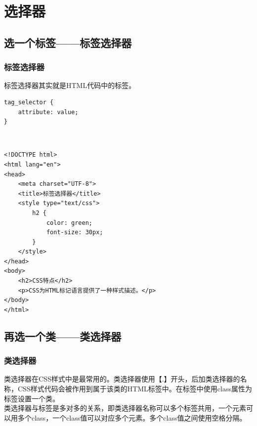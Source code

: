 \newpage

\chapter{选择器}

\section{选一个标签——标签选择器}

\subsection{标签选择器}

标签选择器其实就是HTML代码中的标签。 \\

\begin{lstlisting}[style=htmlcssjs]
tag_selector {
    attribute: value;
}
\end{lstlisting}

\vspace{0.5cm}
 \\
\begin{lstlisting}[style=htmlcssjs]
<!DOCTYPE html>
<html lang="en">
<head>
    <meta charset="UTF-8">
    <title>标签选择器</title>
    <style type="text/css">
        h2 {
            color: green;
            font-size: 30px;
        }
    </style>
</head>
<body>
    <h2>CSS特点</h2>
    <p>CSS为HTML标记语言提供了一种样式描述。</p>
</body>
</html>
\end{lstlisting}

\newpage

\section{再选一个类——类选择器}

\subsection{类选择器}

类选择器在CSS样式中是最常用的。类选择器使用【.】开头，后加类选择器的名称，CSS样式代码会被作用到属于该类的HTML标签中。在标签中使用class属性为标签设置一个类。 \\

类选择器与标签是多对多的关系，即类选择器名称可以多个标签共用，一个元素可以用多个class，一个class值可以对应多个元素。多个class值之间使用空格分隔。 \\

